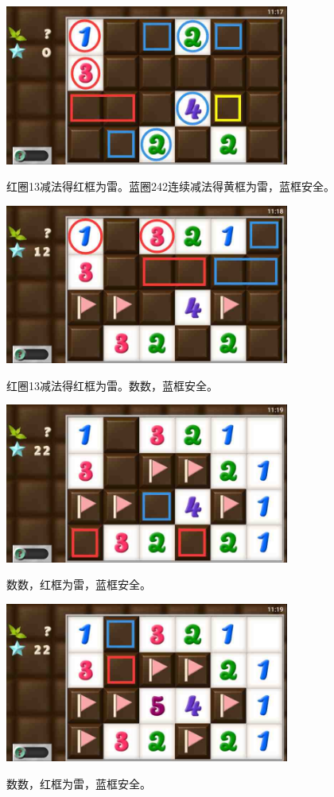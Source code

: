 \subsection{} %
\begin{center}
    \includegraphics[width=0.7\textwidth]{puzzlelow/200-1.jpg}
\end{center}
红圈13减法得红框为雷。蓝圈242连续减法得黄框为雷，蓝框安全。
\begin{center}
    \includegraphics[width=0.7\textwidth]{puzzlelow/200-2.jpg}
\end{center}
红圈13减法得红框为雷。数数，蓝框安全。
\begin{center}
    \includegraphics[width=0.7\textwidth]{puzzlelow/200-3.jpg}
\end{center}
数数，红框为雷，蓝框安全。
\begin{center}
    \includegraphics[width=0.7\textwidth]{puzzlelow/200-4.jpg}
\end{center}
数数，红框为雷，蓝框安全。

